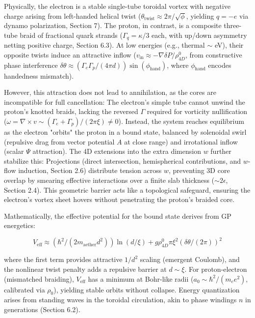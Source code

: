 Physically, the electron is a stable single-tube toroidal vortex with negative charge arising from left-handed helical twist ($\theta_{\text{twist}} \approx 2\pi / \sqrt{\phi}$, yielding $q = -e$ via dynamo polarization, Section 7). The proton, in contrast, is a composite three-tube braid of fractional quark strands ($\Gamma_q = \kappa / 3$ each, with up/down asymmetry netting positive charge, Section 6.3). At low energies (e.g., thermal $\sim$ eV), their opposite twists induce an attractive inflow ($v_{\text{in}} \approx - \nabla \delta P / \rho_{4D}^0$, from constructive phase interference $\delta \theta \approx (\Gamma_e \Gamma_p / (4\pi d)) \sin(\phi_{\text{hand}})$, where $\phi_{\text{hand}}$ encodes handedness mismatch).

However, this attraction does not lead to annihilation, as the cores are incompatible for full cancellation: The electron's simple tube cannot unwind the proton's knotted braids, lacking the reversed $\Gamma$ required for vorticity nullification ($\omega = \nabla \times v \sim (\Gamma_e + \Gamma_p) / (2\pi \xi) \neq 0$). Instead, the system reaches equilibrium as the electron "orbits" the proton in a bound state, balanced by solenoidal swirl (repulsive drag from vector potential $A$ at close range) and irrotational inflow (scalar $\Psi$ attraction). The 4D extensions into the extra dimension $w$ further stabilize this: Projections (direct intersection, hemispherical contributions, and $w$-flow induction, Section 2.6) distribute tension across $w$, preventing 3D core overlap by smearing effective interactions over a finite slab thickness ($\sim 2\epsilon$, Section 2.4). This geometric barrier acts like a topological safeguard, ensuring the electron's vortex sheet hovers without penetrating the proton's braided core.

Mathematically, the effective potential for the bound state derives from GP energetics:

\[
V_{\text{eff}} \approx \left(\hbar^2 / (2 m_{\text{aether}} d^2)\right) \ln(d / \xi) + g \rho_{4D}^0 \pi \xi^2 (\delta \theta / (2\pi))^2
\]

where the first term provides attractive $1/d^2$ scaling (emergent Coulomb), and the nonlinear twist penalty adds a repulsive barrier at $d \sim \xi$. For proton-electron (mismatched braiding), $V_{\text{eff}}$ has a minimum at Bohr-like radii ($a_0 \sim \hbar^2 / (m_e e^2)$, calibrated via $\rho_0$), yielding stable orbits without collapse. Energy quantization arises from standing waves in the toroidal circulation, akin to phase windings $n$ in generations (Section 6.2).


